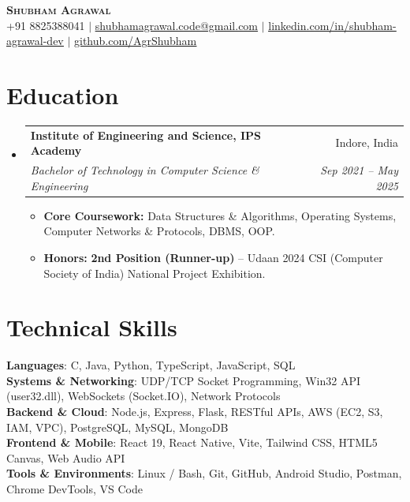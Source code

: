 \documentclass[letterpaper,11pt]{article}
\makeatletter
\newcommand{\resumeItem}[1]{
  \item\small{
    {#1 \vspace{-2pt}}
  }
}
\newcommand{\resumeSubheading}[4]{
  \vspace{-2pt}\item
    \begin{tabular*}{0.97\textwidth}[t]{l@{\extracolsep{\fill}}r}
      \textbf{#1} & #2 \\
      \textit{\small#3} & \textit{\small #4} \\
    \end{tabular*}\vspace{-7pt}
}
\newcommand{\resumeSubHeadingListStart}{\begin{itemize}[leftmargin=0.15in, label={}]}
\newcommand{\resumeSubHeadingListEnd}{\end{itemize}}
\newcommand{\resumeItemListStart}{\begin{itemize}}
\newcommand{\resumeItemListEnd}{\end{itemize}\vspace{-5pt}}
\makeatother
\begin{document}
\begin{center}
    \textbf{\Huge \scshape Shubham Agrawal} \\ \vspace{2pt}
    \small +91 8825388041 $|$ \href{mailto:shubhamagrawal.code@gmail.com}{\underline{shubhamagrawal.code@gmail.com}} $|$ 
    \href{https://linkedin.com/in/shubham-agrawal-dev}{\underline{linkedin.com/in/shubham-agrawal-dev}} $|$
    \href{https://github.com/AgrShubham}{\underline{github.com/AgrShubham}}
\end{center}

\section{Education}
  \resumeSubHeadingListStart
    \resumeSubheading
      {Institute of Engineering and Science, IPS Academy}{Indore, India}
      {Bachelor of Technology in Computer Science \& Engineering}{Sep 2021 -- May 2025}
      \resumeItemListStart
        \resumeItem{\textbf{Core Coursework:} Data Structures \& Algorithms, Operating Systems, Computer Networks \& Protocols, DBMS, OOP.}
        \resumeItem{\textbf{Honors:} \textbf{2nd Position (Runner-up)} -- Udaan 2024 CSI (Computer Society of India) National Project Exhibition.}
      \resumeItemListEnd
  \resumeSubHeadingListEnd

\section{Technical Skills}
 \begin{itemize}[leftmargin=0.15in, label={}]
    \small{\item{
     \textbf{Languages}{: C, Java, Python, TypeScript, JavaScript, SQL} \\
     \textbf{Systems \& Networking}{: UDP/TCP Socket Programming, Win32 API (user32.dll), WebSockets (Socket.IO), Network Protocols} \\
     \textbf{Backend \& Cloud}{: Node.js, Express, Flask, RESTful APIs, AWS (EC2, S3, IAM, VPC), PostgreSQL, MySQL, MongoDB} \\
     \textbf{Frontend \& Mobile}{: React 19, React Native, Vite, Tailwind CSS, HTML5 Canvas, Web Audio API} \\
     \textbf{Tools \& Environments}{: Linux / Bash, Git, GitHub, Android Studio, Postman, Chrome DevTools, VS Code}
    }}
 \end{itemize}
\end{document}

